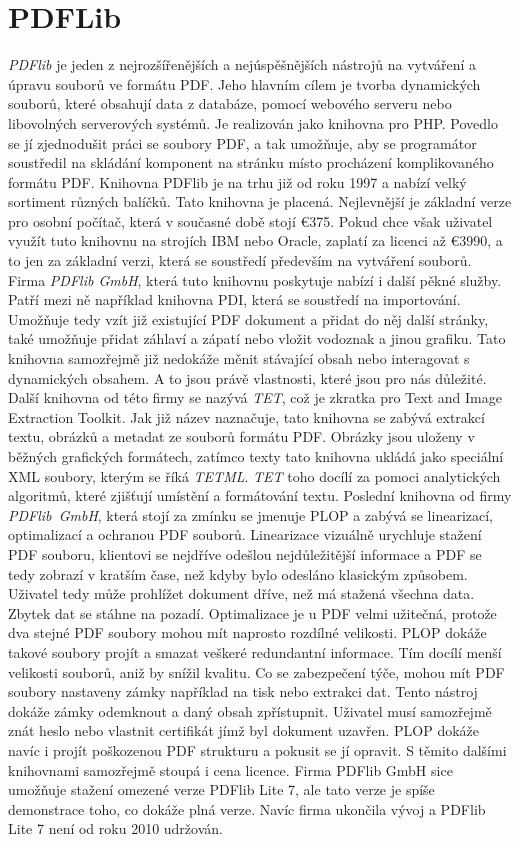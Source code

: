 \documentclass[czech,BP]{thesiskiv}
\begin{document}
\section{PDFLib}
\emph{PDFlib} je jeden z nejrozšířenějších a nejúspěšnějších nástrojů na vytváření a úpravu souborů ve formátu PDF. Jeho hlavním cílem je tvorba dynamických souborů, které obsahují data z databáze, pomocí webového serveru nebo libovolných serverových systémů. Je realizován jako knihovna pro PHP. Povedlo se jí zjednodušit práci se soubory PDF, a tak umožňuje, aby se programátor soustředil na skládání komponent na stránku místo procházení komplikovaného formátu PDF. Knihovna PDFlib je na trhu již od roku 1997 a nabízí velký sortiment různých balíčků. Tato knihovna je placená. Nejlevnější je základní verze pro osobní počítač, která v současné době stojí \euro 375. Pokud chce však uživatel využít tuto knihovnu na strojích IBM nebo Oracle, zaplatí za licenci až \euro 3990, a to jen za základní verzi, která se soustředí především na vytváření souborů. Firma \emph{PDFlib GmbH}, která tuto knihovnu poskytuje nabízí i další pěkné služby. Patří mezi ně například knihovna PDI, která se soustředí na importování. Umožňuje tedy vzít již existující PDF dokument a přidat do něj další stránky, také umožňuje přidat záhlaví a zápatí nebo vložit vodoznak a jinou grafiku. Tato knihovna samozřejmě již nedokáže měnit stávající obsah nebo interagovat s dynamických obsahem. A to jsou právě vlastnosti, které jsou pro nás důležité. Další knihovna od této firmy se nazývá \emph{TET}, což je zkratka pro Text and Image Extraction Toolkit. Jak již název naznačuje, tato knihovna se zabývá extrakcí textu, obrázků a metadat ze souborů formátu PDF. Obrázky jsou uloženy v běžných grafických formátech, zatímco texty tato knihovna ukládá jako speciální XML soubory, kterým se říká \emph{TETML}. \emph{TET} toho docílí za pomoci analytických algoritmů, které zjišťují umístění a formátování textu. Poslední knihovna od firmy \mbox{\emph{PDFlib GmbH}}, která stojí za zmínku se jmenuje PLOP a zabývá se linearizací, optimalizací a ochranou PDF souborů. Linearizace vizuálně urychluje stažení PDF souboru, klientovi se nejdříve odešlou nejdůležitější informace a PDF se tedy zobrazí v kratším čase, než kdyby bylo odesláno klasickým způsobem. Uživatel tedy může prohlížet dokument dříve, než má stažená všechna data. Zbytek dat se stáhne na pozadí. Optimalizace je u PDF velmi užitečná, protože dva stejné PDF soubory mohou mít naprosto rozdílné velikosti. PLOP dokáže takové soubory projít a smazat veškeré redundantní informace. Tím docílí menší velikosti souborů, aniž by snížil kvalitu. Co se zabezpečení týče, mohou mít PDF soubory nastaveny zámky například na tisk nebo extrakci dat. Tento nástroj dokáže zámky odemknout a daný obsah zpřístupnit. Uživatel musí samozřejmě znát heslo nebo vlastnit certifikát jímž byl dokument uzavřen. PLOP dokáže navíc i projít poškozenou PDF strukturu a pokusit se jí opravit. S těmito dalšími knihovnami samozřejmě stoupá i cena licence. Firma PDFlib GmbH sice umožňuje stažení omezené verze PDFlib Lite 7, ale tato verze je spíše demonstrace toho, co dokáže plná verze. Navíc  firma ukončila vývoj a PDFlib Lite 7 není od roku 2010 udržován\cite{PDFlib}.
\end{document}
